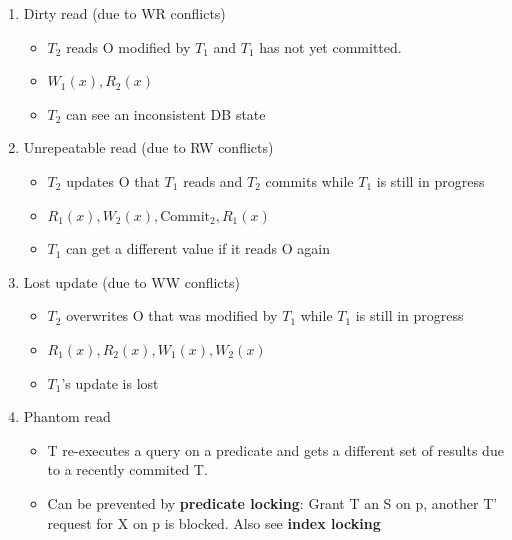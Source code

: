 \documentclass[8pt, landscape]{extarticle}
\begin{document}
\begin{multicols*}{4}
  \begin{enumerate}
    \item Dirty read (due to WR conflicts)
    \begin{itemize}
      \item $T_2$ reads O modified by $T_1$ and $T_1$ has not yet committed.
      \item $W_1(x), R_2(x)$
      \item $T_2$ can see an inconsistent DB state 
    \end{itemize}
    \item Unrepeatable read (due to RW conflicts)
    \begin{itemize}
      \item $T_2$ updates O that $T_1$ reads and $T_2$ commits while $T_1$ is still in progress
      \item $R_1(x), W_2(x), \text{Commit}_2, R_1(x)$
      \item $T_1$ can get a different value if it reads O again
    \end{itemize} 
    \item Lost update (due to WW conflicts)
    \begin{itemize}
      \item $T_2$ overwrites O that was modified by $T_1$ while $T_1$ is still in progress
      \item $R_1(x), R_2(x), W_1(x), W_2(x)$
      \item $T_1$'s update is lost
    \end{itemize}
    \item Phantom read
    \begin{itemize}
      \item T re-executes a query on a predicate and gets a different set of results due to a recently commited T.
      \item Can be prevented by \textbf{predicate locking}: Grant T an S on p, another T' request for X on p is blocked. Also see \textbf{index locking}
    \end{itemize}
  \end{enumerate}


\end{multicols*}
\end{document}

